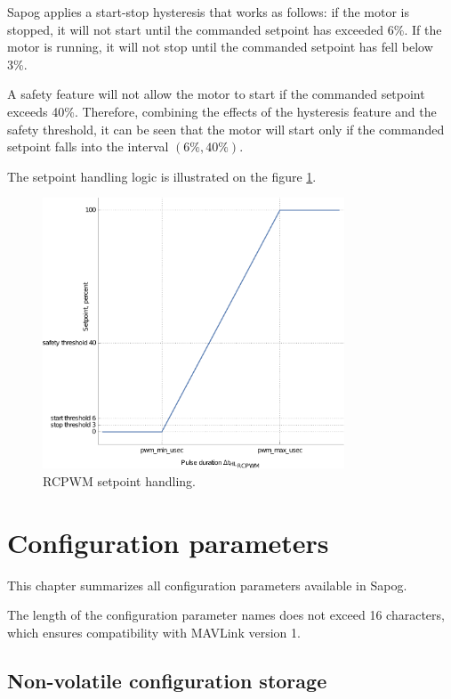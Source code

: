 \documentclass{zubaxdoc}
\begin{document}
Sapog applies a start-stop hysteresis that works as follows: if the motor is stopped, it will not start
until the commanded setpoint has exceeded 6\%.
If the motor is running, it will not stop until the commanded setpoint has fell below 3\%.

A safety feature will not allow the motor to start if the commanded setpoint exceeds 40\%.
Therefore, combining the effects of the hysteresis feature and the safety threshold,
it can be seen that the motor will start only if the commanded setpoint falls into the interval
$\left(6\%, 40\%\right)$.

The setpoint handling logic is illustrated on the figure \ref{rcpwm_setpoint_handling}.

\begin{figure}[hbt]
    \centering
	\includegraphics[width=0.8\textwidth]{rcpwm_setpoint_handling}
	\caption{RCPWM setpoint handling.
	\label{rcpwm_setpoint_handling}}
\end{figure}

\chapter{Configuration parameters}\label{sec:configuration_parameters}

This chapter summarizes all configuration parameters available in Sapog.

The length of the configuration parameter names does not exceed 16 characters,
which ensures compatibility with MAVLink version 1.

\section{Non-volatile configuration storage}
\end{document}
